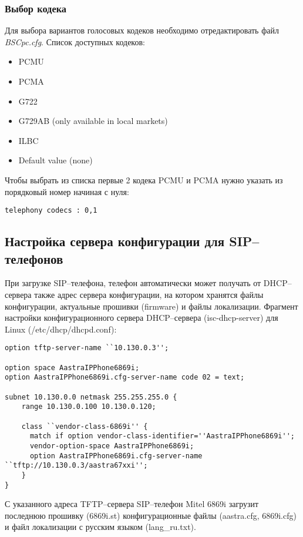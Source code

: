 \subsubsection{Выбор кодека}
Для выбора вариантов голосовых кодеков необходимо отредактировать файл {\em BSCpc.cfg}. 
Список доступных кодеков:
\begin{itemize}
	\item PCMU
	\item PCMA
	\item G722
	\item G729AB (only available in local markets)
	\item ILBC
	\item Default value  (none)
\end{itemize}

Чтобы выбрать из списка первые 2 кодека PCMU и PCMA нужно указать из порядковый номер начиная с нуля:
\begin{lstlisting}
telephony codecs : 0,1
\end{lstlisting}

\subsection{Настройка сервера конфигурации для SIP--телефонов}
При загрузке SIP--телефона, телефон автоматически может получать от DHCP--сервера также адрес сервера конфигурации, на котором хранятся файлы конфигурации, актуальные прошивки (firmware) и файлы локализации.
Фрагмент настройки конфигурационного сервера DHCP--сервера (isc-dhcp-server) для Linux (/etc/dhcp/dhcpd.conf):
\begin{lstlisting}
option tftp-server-name ``10.130.0.3'';

option space AastraIPPhone6869i;
option AastraIPPhone6869i.cfg-server-name code 02 = text;

subnet 10.130.0.0 netmask 255.255.255.0 {
    range 10.130.0.100 10.130.0.120;

    class ``vendor-class-6869i'' {
      match if option vendor-class-identifier=''AastraIPPhone6869i'';
      vendor-option-space AastraIPPhone6869i;
      option AastraIPPhone6869i.cfg-server-name ``tftp://10.130.0.3/aastra67xxi'';
    }
}
\end{lstlisting}

С указанного адреса TFTP--сервера SIP--телефон Mitel 6869i загрузит последнюю прошивку (6869i.st) конфигурационные файлы (aastra.cfg, 6869i.cfg) и файл локализации с русским языком (lang\_ru.txt).

